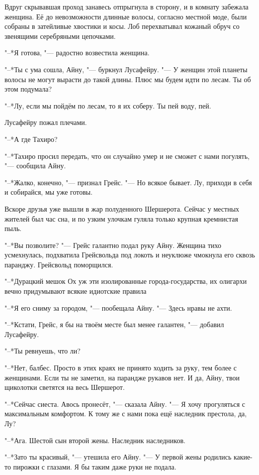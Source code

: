 Вдруг скрывавшая проход занавесь отпрыгнула в сторону, и в комнату забежала женщина.
Её до невозможности длинные волосы, согласно местной моде, были собраны в затейливые хвостики и косы.
Лоб перехватывал кожаный обруч со звенящими серебряными цепочками.

"--*Я готова, "--- радостно возвестила женщина.

"--*Ты с ума сошла, Айну, "--- буркнул Лусафейру.
"--- У женщин этой планеты волосы не могут вырасти до такой длины.
Плюс мы будем идти по лесам.
Ты об этом подумала?

"--*Лу, если мы пойдём по лесам, то я их соберу.
Ты пей воду, пей.

Лусафейру пожал плечами.

"--*А где Тахиро?

"--*Тахиро просил передать, что он случайно умер и не сможет с нами погулять, "--- сообщила Айну.

"--*Жалко, конечно, "--- признал Грейс.
"--- Но всякое бывает.
Лу, приходи в себя и собирайся, мы уже готовы.

\razd

Вскоре друзья уже вышли в жар полуденного Шершерота.
Сейчас у местных жителей был час сна, и по узким улочкам гуляла только крупная кремнистая пыль.

"--*Вы позволите? "--- Грейс галантно подал руку Айну.
Женщина тихо усмехнулась, подхватила Грейсвольда под локоть и неуклюже чмокнула его сквозь паранджу.
Грейсвольд поморщился.

"--*Дурацкий мешок\ldotst
Ох уж эти изолированные города-государства, их олигархи вечно придумывают всякие идиотские правила\ldotst

"--*Я его сниму за городом, "--- пообещала Айну.
"--- Здесь нравы не ахти.

"--*Кстати, Грейс, я бы на твоём месте был менее галантен, "--- добавил Лусафейру.

"--*Ты ревнуешь, что ли?

"--*Нет, балбес.
Просто в этих краях не принято ходить за руку, тем более с женщинами.
Если ты не заметил, на парандже рукавов нет.
И да, Айну, твои щиколотки светятся на весь Шершерот.

"--*Сейчас сиеста.
Авось пронесёт, "--- сказала Айну.
"--- Я хочу прогуляться с максимальным комфортом.
К тому же с нами пока ещё наследник престола, да, Лу?

"--*Ага.
Шестой сын второй жены.
Наследник наследников.

"--*Зато ты красивый, "--- утешила его Айну.
"--- У первой жены родились какие-то пирожки с глазами.
Я бы таким даже руки не подала.

